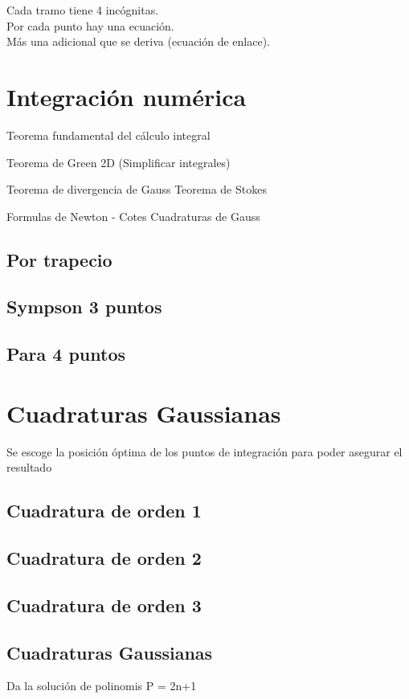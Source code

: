Cada tramo tiene 4 inc\'ognitas.\\
Por cada punto hay una ecuaci\'on.\\
M\'as una adicional que se deriva (ecuaci\'on de enlace).

\section{Integraci\'on num\'erica}

Teorema fundamental del c\'alculo integral

Teorema de Green 2D (Simplificar integrales)

Teorema de divergencia de Gauss
Teorema de Stokes


Formulas de Newton - Cotes
Cuadraturas de Gauss

\subsection{Por trapecio}

\subsection{Sympson 3 puntos}

\subsection{Para 4 puntos}

\section{Cuadraturas Gaussianas}
Se escoge la posici\'on \'optima de los puntos de integraci\'on para poder asegurar el resultado


\subsection{Cuadratura de orden 1}

\subsection{Cuadratura de orden 2}

\subsection{Cuadratura de orden 3}

\subsection{Cuadraturas Gaussianas}
Da la soluci\'on de polinomis P = 2n+1